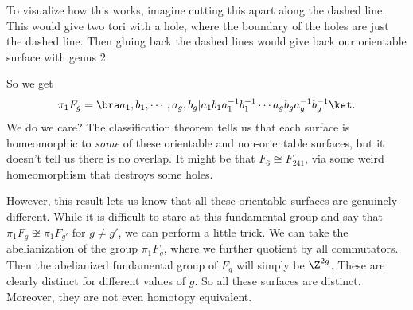 \documentclass[a4paper]{article}
\begin{document}
\begin{eg}
\begin{center}
  \end{center}
  To visualize how this works, imagine cutting this apart along the dashed line. This would give two tori with a hole, where the boundary of the holes are just the dashed line. Then gluing back the dashed lines would give back our orientable surface with genus 2.
  \begin{center}
  \end{center}
  So we get
  \[
    \pi_1 F_g = \bra a_1, b_1, \cdots, a_g, b_g| a_1 b_1 a_1^{-1} b_1^{-1} \cdots a_g b_g a_g^{-1}b_g^{-1}\ket.
  \]
  We do we care? The classification theorem tells us that each surface is homeomorphic to \emph{some} of these orientable and non-orientable surfaces, but it doesn't tell us there is no overlap. It might be that $F_6\cong F_{241}$, via some weird homeomorphism that destroys some holes.

  However, this result lets us know that all these orientable surfaces are genuinely different. While it is difficult to stare at this fundamental group and say that $\pi_1 F_g \not\cong \pi_1 F_{g'}$ for $g\not= g'$, we can perform a little trick. We can take the abelianization of the group $\pi_1 F_g$, where we further quotient by all commutators. Then the abelianized fundamental group of $F_g$ will simply be $\Z^{2g}$. These are clearly distinct for different values of $g$. So all these surfaces are distinct. Moreover, they are not even homotopy equivalent.
\end{eg}
\end{document}
